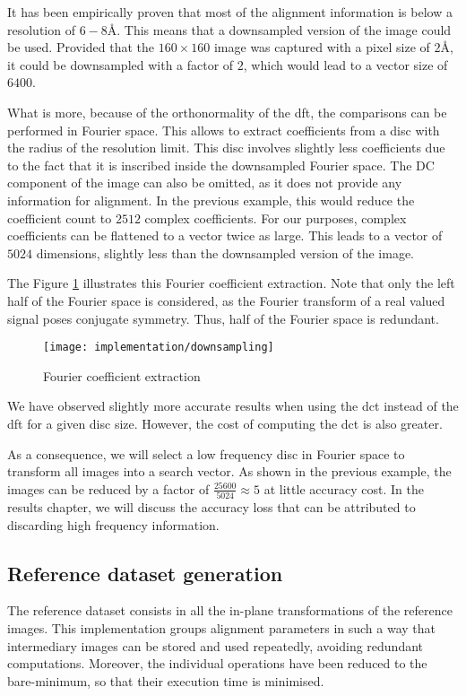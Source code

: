 \documentclass[../main.tex]{subfiles}
\begin{document}
It has been empirically proven that most of the alignment information is below a resolution of $6-8 \si{\angstrom}$\cite{scheres2021}. This means that a downsampled version of the image could be used. Provided that the $160\times160$ image was captured with a pixel size of $2 \si{\angstrom}$, it could be downsampled with a factor of $2$, which would lead to a vector size of $6400$. 

What is more, because of the orthonormality of the \gls{dft}, the comparisons can be performed in Fourier space. This allows to extract coefficients from a disc with the radius of the resolution limit. This disc involves slightly less coefficients due to the fact that it is inscribed inside the downsampled Fourier space. The DC component of the image can also be omitted, as it does not provide any information for alignment. In the previous example, this would reduce the coefficient count to $2512$ complex coefficients. For our purposes, complex coefficients can be flattened to a vector twice as large. This leads to a vector of $5024$ dimensions, slightly less than the downsampled version of the image.

The Figure \ref{fig:4:downsampling} illustrates this Fourier coefficient extraction. Note that only the left half of the Fourier space is considered, as the Fourier transform of a real valued signal poses conjugate symmetry. Thus, half of the Fourier space is redundant. 

\begin{figure}[htbp]
    \centering
    \texttt{[image: implementation/downsampling]}
    \caption{Fourier coefficient extraction}
    \label{fig:4:downsampling}
\end{figure}

We have observed slightly more accurate results when using the \gls{dct} instead of the \gls{dft} for a given disc size. However, the cost of computing the \gls{dct} is also greater.

As a consequence, we will select a low frequency disc in Fourier space to transform all images into a search vector. As shown in the previous example, the images can be reduced by a factor of $\frac{25600}{5024} \approx 5$ at little accuracy cost. In the results chapter, we will discuss the accuracy loss that can be attributed to discarding high frequency information.

\subsection{Reference dataset generation}
The reference dataset consists in all the in-plane transformations of the reference images. This implementation groups alignment parameters in such a way that intermediary images can be stored and used repeatedly, avoiding redundant computations. Moreover, the individual operations have been reduced to the bare-minimum, so that their execution time is minimised.
\end{document}
